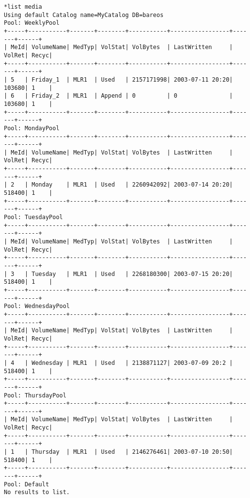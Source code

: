 \footnotesize
\begin{verbatim}
*list media
Using default Catalog name=MyCatalog DB=bareos
Pool: WeeklyPool
+-----+-----------+-------+--------+-----------+-----------------+-------+------+
| MeId| VolumeName| MedTyp| VolStat| VolBytes  | LastWritten     | VolRet| Recyc|
+-----+-----------+-------+--------+-----------+-----------------+-------+------+
| 5   | Friday_1  | MLR1  | Used   | 2157171998| 2003-07-11 20:20| 103680| 1    |
| 6   | Friday_2  | MLR1  | Append | 0         | 0               | 103680| 1    |
+-----+-----------+-------+--------+-----------+-----------------+-------+------+
Pool: MondayPool
+-----+-----------+-------+--------+-----------+-----------------+-------+------+
| MeId| VolumeName| MedTyp| VolStat| VolBytes  | LastWritten     | VolRet| Recyc|
+-----+-----------+-------+--------+-----------+-----------------+-------+------+
| 2   | Monday    | MLR1  | Used   | 2260942092| 2003-07-14 20:20| 518400| 1    |
+-----+-----------+-------+--------+-----------+-----------------+-------+------+
Pool: TuesdayPool
+-----+-----------+-------+--------+-----------+-----------------+-------+------+
| MeId| VolumeName| MedTyp| VolStat| VolBytes  | LastWritten     | VolRet| Recyc|
+-----+-----------+-------+--------+-----------+-----------------+-------+------+
| 3   | Tuesday   | MLR1  | Used   | 2268180300| 2003-07-15 20:20| 518400| 1    |
+-----+-----------+-------+--------+-----------+-----------------+-------+------+
Pool: WednesdayPool
+-----+-----------+-------+--------+-----------+-----------------+-------+------+
| MeId| VolumeName| MedTyp| VolStat| VolBytes  | LastWritten     | VolRet| Recyc|
+-----+-----------+-------+--------+-----------+-----------------+-------+------+
| 4   | Wednesday | MLR1  | Used   | 2138871127| 2003-07-09 20:2 | 518400| 1    |
+-----+-----------+-------+--------+-----------+-----------------+-------+------+
Pool: ThursdayPool
+-----+-----------+-------+--------+-----------+-----------------+-------+------+
| MeId| VolumeName| MedTyp| VolStat| VolBytes  | LastWritten     | VolRet| Recyc|
+-----+-----------+-------+--------+-----------+-----------------+-------+------+
| 1   | Thursday  | MLR1  | Used   | 2146276461| 2003-07-10 20:50| 518400| 1    |
+-----+-----------+-------+--------+-----------+-----------------+-------+------+
Pool: Default
No results to list.
\end{verbatim}
\normalsize
